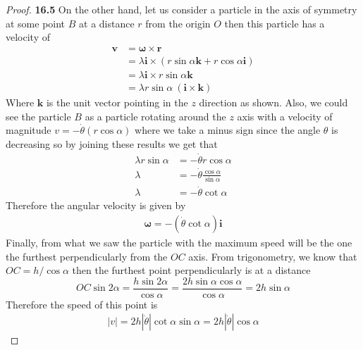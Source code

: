 \documentclass[11pt]{article}
\theoremstyle{definition}
\begin{document}
\begin{proof}{\textbf{16.5}}
    On the other hand, let us consider a particle in the axis of symmetry
    at some point $B$ at a distance $r$ from the origin $O$ then
    this particle has a velocity of 
    \begin{align*}
        \bm{v} &= \bm{\omega} \times \bm{r}\\
            &= \lambda \bm{i} \times (r\sin\alpha\bm{k} + r\cos\alpha \bm{i})\\
            &= \lambda \bm{i} \times r\sin\alpha\bm{k}\\
            &= \lambda r\sin \alpha~(\bm{i} \times \bm{k})
    \end{align*}
    Where $\bm{k}$ is the unit vector pointing in the $z$ direction as shown.
    Also, we could see the particle $B$ as a particle rotating around the $z$
    axis with a velocity of magnitude $v = -\dot\theta (r\cos\alpha)$ where 
    we take a minus sign since the angle $\theta$ is decreasing so by
    joining these results we get that
    \begin{align*}
        \lambda r\sin \alpha &= -\dot\theta r\cos\alpha\\
        \lambda &= -\dot\theta \frac{\cos\alpha}{\sin \alpha}\\
        \lambda &= -\dot\theta \cot\alpha
    \end{align*}
    Therefore the angular velocity is given by
    \begin{align*}
        \bm\omega = -(\dot\theta \cot\alpha) \bm{i}
    \end{align*}
    Finally, from what we saw the particle with the maximum speed will be the
    one the furthest perpendicularly from the $OC$ axis.
    From trigonometry, we know that $OC = h/\cos\alpha$ then the furthest point
    perpendicularly is at a distance
    $$OC \sin 2\alpha = \frac{h\sin 2\alpha}{\cos\alpha}
    = \frac{2h\sin\alpha\cos\alpha}{\cos\alpha} = 2h\sin\alpha$$
    Therefore the speed of this point is 
    \begin{align*}
        |v| = 2h|\dot\theta| \cot\alpha \sin\alpha = 2h|\dot\theta|\cos\alpha
    \end{align*}
\end{proof}
\end{document}
